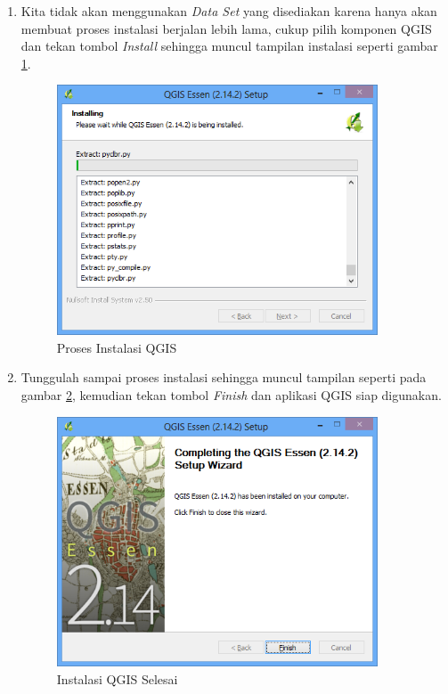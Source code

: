 \begin{enumerate}[A.]
\begin{enumerate}[1.]
\item Kita tidak akan menggunakan \textit{Data Set} yang disediakan karena hanya akan membuat proses instalasi berjalan lebih lama, cukup pilih komponen QGIS dan tekan tombol \textit{Install} sehingga muncul tampilan instalasi seperti gambar \ref{fig:prosesinstalasi}.

\begin{figure}[H]
  \centering
  \includegraphics[width=0.9\textwidth]{./resources/install-win/006-installing}
  \caption{Proses Instalasi QGIS}
  \label{fig:prosesinstalasi}
\end{figure}

\item Tunggulah sampai proses instalasi sehingga muncul tampilan seperti pada gambar \ref{fig:finishinstalasi}, kemudian tekan tombol \textit{Finish} dan aplikasi QGIS siap digunakan.

\begin{figure}[H]
  \centering
  \includegraphics[width=0.9\textwidth]{./resources/install-win/007-finished}
  \caption{Instalasi QGIS Selesai}
  \label{fig:finishinstalasi}
\end{figure}


\end{enumerate}
\end{enumerate}
